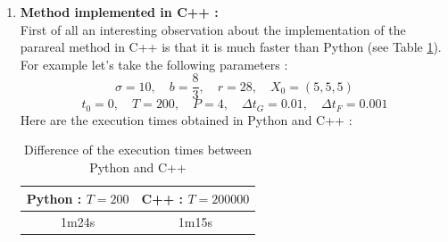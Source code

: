 \begin{enumerate}[label=\textbullet]
	\begin{itemize}[label=-]
		\item It seems that the time in sequential and with the parareal method with 1 process is not the same. Moreover for the different steps calculated, we have that the execution time with 1 process is greater than for the sequential method. This can be explained by 2 main things. First of all, we have seen previously that there are necessarily 2 iterations which are done on $[t_0,T]$ contrary to the sequential method where there is only one. This problem is easily solved if we compute only the fine and coarse solutions at the first iteration (because the point $U_0^k$ is identical for all k). Thereafter, the parareal method also computes the coarse solution which is not needed at all.
		\item It seems that the time for the parareal method with $P$ processes is not the time of the sequential method divided by $P$. It seems obvious that (with intervals of the same length for each process), the time for the parareal method is only divided by P if there is only one iteration, which is never the case.
		\item It seems that if we increase the number of processes, the time does not necessarily decrease (as between $P=3$ and $P=4$ for $\Delta t_F=0.001$ and $\Delta t_G=0.01$), so we have to find the right balance between the parameters $\Delta t_F$, $\Delta t_G$, $[t_0,T]$ and $P$.
	\end{itemize}
	\item \textbf{Method implemented in C++ :} \\
	First of all an interesting observation about the implementation of the parareal method in C++ is that it is much faster than Python (see Table \ref{cpp_faster}). \\
	For example let's take the following parameters :
	$$\sigma=10, \quad b=\frac{8}{3}, \quad r=28, \quad X_0=(5,5,5)$$
	$$t_0=0, \quad T=200, \quad P=4,\quad \Delta t_G=0.01, \quad \Delta t_F=0.001$$
	Here are the execution times obtained in Python and C++ :
	\begin{table}[H]
		\centering
		\begin{tabular}{| c | c |}
			\hline
			Python : $T=200$ & C++ : $T=200000$ \\
			\hline 
			1m24s & 1m15s \\
			\hline
		\end{tabular}
		\caption{Difference of the execution times between Python and C++}
		\label{cpp_faster}
	\end{table}

\end{enumerate}
